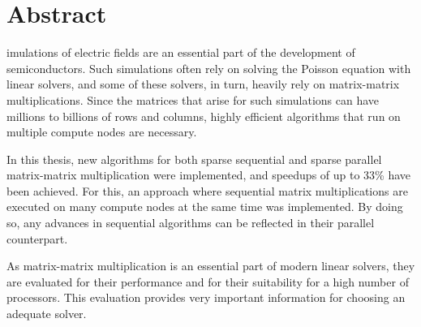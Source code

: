%
%
%

\chapter*{Abstract}

imulations of electric fields are an essential part of the development of semiconductors. Such simulations often rely on solving the Poisson equation with linear solvers, and some of these solvers, in turn, heavily rely on matrix-matrix multiplications. Since the matrices that arise for such simulations can have millions to billions of rows and columns, highly efficient algorithms that run on multiple compute nodes are necessary. 

In this thesis, new algorithms for both sparse sequential and sparse parallel matrix-matrix multiplication were implemented, and speedups of up to 33\% have been achieved. For this, an approach where sequential matrix multiplications are executed on many compute nodes at the same time was implemented. By doing so, any advances in sequential algorithms can be reflected in their parallel counterpart.

As matrix-matrix multiplication is an essential part of modern linear solvers, they are evaluated for their performance and for their suitability for a high number of processors. This evaluation provides very important information for choosing an adequate solver.
\clearpage